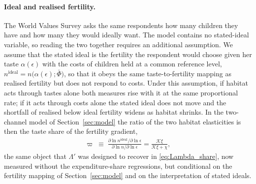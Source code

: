 \documentclass[11pt]{article}
\begin{document}
\paragraph{Ideal and realised fertility.}
The World Values Survey asks the same respondents how many children they have and how many they
would ideally want. The model contains no stated-ideal variable, so reading the two together requires
an additional assumption. We assume that the stated ideal is the fertility the respondent would choose
given her taste $\alpha(\epsilon)$ with the costs of children held at a common reference level,
$n^{\text{ideal}}=n\big(\alpha(\epsilon);\bar\Phi\big)$, so that it obeys the same taste-to-fertility
mapping as realised fertility but does not respond to costs. Under this assumption, if habitat acts
through tastes alone both measures rise with it at the same proportional rate; if it acts through costs
alone the stated ideal does not move and the shortfall of realised below ideal fertility widens as
habitat shrinks. In the two-channel model of Section~\ref{sec:model} the ratio of the two habitat
elasticities is then the taste share of the fertility gradient,
\begin{align}
\varpi\;\equiv\;\frac{\partial\ln n^{\text{ideal}}/\partial\ln\epsilon}{\partial\ln n/\partial\ln\epsilon}
=\frac{\mathcal{K}\xi}{\mathcal{K}\xi+\chi},
\label{eq:tau}
\end{align}
the same object that $\Lambda'$ was designed to recover in \eqref{eq:Lambda_share}, now measured
without the expenditure-share regressions, but conditional on the fertility mapping of
Section~\ref{sec:model} and on the interpretation of stated ideals.
\end{document}
